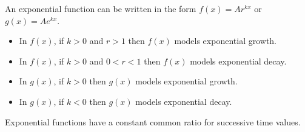 % 


\begin{summary}
\item An exponential function can be written in the form $f(x) = A r^{kx}$ or $g(x) = A
    e^{kx}$.  
    \begin{itemize}
        \item In $f(x)$, if $k>0$ and $r>1$ then $f(x)$ models exponential growth.
        \item In $f(x)$, if $k>0$ and $0<r<1$ then $f(x)$ models exponential decay.
        \item In $g(x)$, if $k>0$ then $g(x)$ models exponential growth.
        \item In $g(x)$, if $k<0$ then $g(x)$ models exponential decay.
    \end{itemize}
\item Exponential functions have a constant common ratio for successive time values.
\end{summary}

\nin \hrulefill





\clearpage
